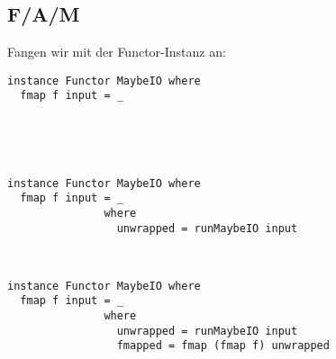 \documentclass{beamer}
\begin{document}
\subsection{F/A/M}
\begin{frame}[fragile]
Fangen wir mit der Functor-Instanz an:
\begin{overprint}
\begin{verbatim}
instance Functor MaybeIO where
  fmap f input = _

  
  
                 
\end{verbatim}
\begin{verbatim}
instance Functor MaybeIO where
  fmap f input = _
               where
                 unwrapped = runMaybeIO input

                 
\end{verbatim}
\begin{verbatim}
instance Functor MaybeIO where
  fmap f input = _
               where
                 unwrapped = runMaybeIO input
                 fmapped = fmap (fmap f) unwrapped


\end{verbatim}
\end{overprint}
\end{frame}
\end{document}
